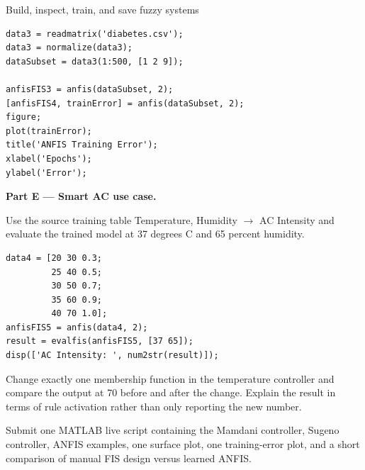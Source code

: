 \begin{labproject}{Build, inspect, train, and save fuzzy systems}
\begin{lstlisting}[style=mlmatlab]
data3 = readmatrix('diabetes.csv');
data3 = normalize(data3);
dataSubset = data3(1:500, [1 2 9]);

anfisFIS3 = anfis(dataSubset, 2);
[anfisFIS4, trainError] = anfis(dataSubset, 2);
figure;
plot(trainError);
title('ANFIS Training Error');
xlabel('Epochs');
ylabel('Error');
\end{lstlisting}

\medskip\noindent\textbf{Part E --- Smart AC use case.}\par
Use the source training table Temperature, Humidity $\to$ AC Intensity and evaluate the trained model at 37 degrees C and 65 percent humidity.

\begin{lstlisting}[style=mlmatlab]
data4 = [20 30 0.3;
         25 40 0.5;
         30 50 0.7;
         35 60 0.9;
         40 70 1.0];
anfisFIS5 = anfis(data4, 2);
result = evalfis(anfisFIS5, [37 65]);
disp(['AC Intensity: ', num2str(result)]);
\end{lstlisting}

\begin{tryit}
Change exactly one membership function in the temperature controller and compare the output at 70 before and after the change. Explain the result in terms of rule activation rather than only reporting the new number.
\end{tryit}
\end{labproject}

\begin{labdeliverable}
Submit one MATLAB live script containing the Mamdani controller, Sugeno controller, ANFIS examples, one surface plot, one training-error plot, and a short comparison of manual FIS design versus learned ANFIS.
\end{labdeliverable}

